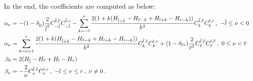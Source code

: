 In the end, the coefficients are computed as below:
\begin{subequations}\label{eq:bg_hv_dx_coef}
  \begin{align}
    \label{eq:bg_hv_dx_coef_alpha_neg}
    \alpha_{\nu} &= -(1-\delta_{\bl l})\frac{2}{\bl^2}C^{\bl,\br}_{-\bl}C^{\bl,r}_{-\bl}-\sum_{k=-l}^{\nu}\frac{2(1+k(H_{\bl+k}-H_{\br-k}+H_{l+k}-H_{r-k}))}{k^2}C^{\bl,\br}_kC^{l,r}_k\,,\ -\bl\le\nu<0 \\
    \label{eq:bg_hv_dx_coef_alpha_pos}
    \alpha_{\nu} &= \sum_{k=\nu+1}^{r}\frac{2(1+k(H_{\bl+k}-H_{\br-k}+H_{l+k}-H_{r-k}))}{k^2}C^{\bl,\br}_kC^{l,r}_k+(1-\delta_{\br r})\frac{2}{\br^2}C^{\bl,\br}_{\br}C^{l,\br}_{\br}\,,\ 0\le\nu<\br \\
    \label{eq:bg_hv_dx_coef_beta_zero}
    \beta_0 &= 2(H_{\bl}-H_{\br}+H_l-H_r) \\
    \label{eq:bg_hv_dx_coef_beta_nzero}
    \beta_{\nu} &= -\frac{2}{\nu}C^{\bl,\br}_{\nu}C^{l,r}_{\nu}\,,\ -l\le\nu\le r\,,\ \nu\ne0\;.
  \end{align}
\end{subequations}
